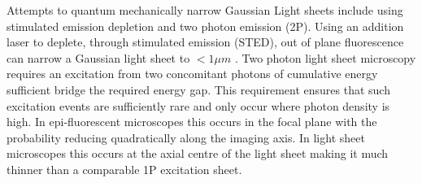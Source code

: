 Attempts to quantum mechanically narrow Gaussian Light sheets include using stimulated emission depletion and two photon emission (2P).
Using an addition laser to deplete, through stimulated emission (STED), out of plane fluorescence can narrow a Gaussian light sheet to $<1 \mu m$ \cite{friedrich_sted-spim:_2011}.
Two photon light sheet microscopy requires an excitation from two concomitant photons of cumulative energy sufficient bridge the required energy gap.
This requirement ensures that such excitation events are sufficiently rare and only occur where photon density is high.
In epi-fluorescent microscopes this occurs in the focal plane with the probability reducing quadratically along the imaging axis.
In light sheet microscopes this occurs at the axial centre of the light sheet making it much thinner than a comparable 1P excitation sheet.

